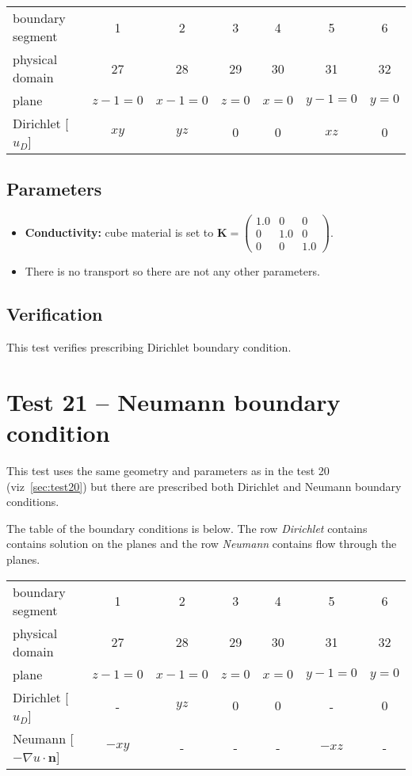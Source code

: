\begin{center}
  \begin{tabular}{|l|c|c|c|c|c|c|}
      \hline
      boundary segment & 1 & 2 & 3 & 4 & 5 & 6 \\ 
      physical domain & 27 & 28 & 29 & 30 & 31 & 32 \\ 
      plane & $z-1=0$  & $x-1=0$ & $z=0$ & $x=0$ & $y-1=0$& $y=0$\\
      Dirichlet [$u_D$] & $xy$ & $yz$ & $0$ & $0$ & $xz$ & $0$\\
      \hline
  \end{tabular}
\end{center}

\subsection*{Parameters}
\begin{itemize}
  \item \textbf{Conductivity:} cube material is set to $\mathbf{K}=\left(\begin{array}{ccc} 1.0 & 0 & 0 \\ 0 & 1.0 & 0 \\ 0 & 0 & 1.0\end{array} \right)$.
  \item There is no transport so there are not any other parameters.
\end{itemize}

\subsection*{Verification}
This test verifies prescribing Dirichlet boundary condition.


\section{Test 21 -- Neumann boundary condition}
\label{sec:test21}
This test uses the same geometry and parameters as in the test 20 (viz~\ref{sec:test20}) but there are prescribed both Dirichlet and Neumann boundary conditions. 

The table of the boundary conditions is below. The row \emph{Dirichlet} contains contains solution on the planes and the row \emph{Neumann} contains flow through the planes.

\begin{center}
  \begin{tabular}{|l|c|c|c|c|c|c|}
      \hline
      boundary segment & 1 & 2 & 3 & 4 & 5 & 6 \\ 
      physical domain & 27 & 28 & 29 & 30 & 31 & 32 \\ 
      plane & $z-1=0$  & $x-1=0$ & $z=0$ & $x=0$ & $y-1=0$& $y=0$\\
      Dirichlet [$u_D$] 
	  &   -   & $yz$ & $0$ & $0$ &   -   & $0$\\
      Neumann [$-\nabla{}u\cdot{}\mathbf{n}$] 
	  & $-xy$ &   -  &  -  &  -  & $-xz$ & - \\
      \hline
  \end{tabular}
\end{center}

